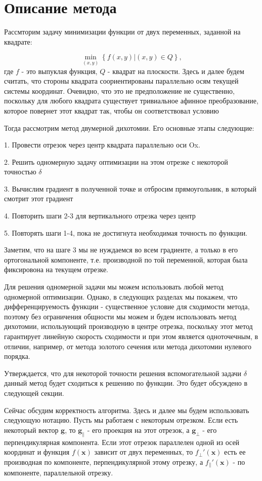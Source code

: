\documentclass[12pt]{article}
\begin{document}
\tableofcontents
\newpage


\section{Описание метода}

Рассмторим задачу минимизации функции от двух переменных, заданной на квадрате:

$$\min_{(x,y)}\left\{f(x,y)|(x,y) \in Q\right\},$$
где $f$ - это выпуклая функция, $Q$ - квадрат на плоскости. Здесь и далее будем считать, что стороны квадрата соориентированы параллельно осям текущей системы координат. Очевидно, что это не предположение не существенно, поскольку для любого квадрата существует тривиальное афинное преобразование, которое повернет этот квадрат так, чтобы он соответствовал условию

Тогда рассмотрим метод двумерной дихотомии. Его основные этапы следующие:

1. Провести отрезок через центр квадрата параллельно оси Ox.

2. Решить одномерную задачу оптимизации на этом отрезке с некоторой точностью $\delta$

3. Вычислим градиент в полученной точке и отбросим прямоугольник, в который смотрит этот градиент

4. Повторить шаги 2-3 для вертикального отрезка через центр

5. Повторять шаги 1-4, пока не достигнута необходимая точность по функции.

Заметим, что на шаге 3 мы не нуждаемся во всем градиенте, а только в его ортогональной компоненте, т.е. производной по той переменной, которая была фиксировона на текущем отрезке.

Для решения одномерной задачи мы можем использовать любой метод одномерной оптимизации. Однако, в следующих разделах мы покажем, что дифференцируемость функции - существенное условие для сходимости метода, поэтому без ограничения общности мы можем и будем использовать метод дихотомии, использующий производную в центре отрезка, поскольку этот метод гарантирует линейную скорость сходимости и при этом является одноточечным, в отличии, например, от метода золотого сечения или метода дихотомии нулевого порядка.

Утверждается, что для некоторой точности решения вспомогательной задачи $\delta$ данный метод будет сходиться к решению по функции. Это будет обсуждено в следующей секции.

Сейчас обсудим корректность алгоритма. Здесь и далее мы будем использовать следующую нотацию. Пусть мы работаем с некоторым отрезком. Если есть некоторый вектор $\textbf{g}$, то $\textbf{g}_\parallel$ - его проекция на этот отрезок, а $\textbf{g}_\perp$ - его перпендикулярная компонента. Если этот отрезок параллелен одной из осей координат и функция $f(\textbf{x})$ зависит от двух переменных, то $f_\perp'(\textbf{x})$ есть ее производная по компоненте, перпендикулярной этому отрезку, а $f_\parallel'(\textbf{x})$ - по компоненте, параллельной отрезку.
\end{document}
